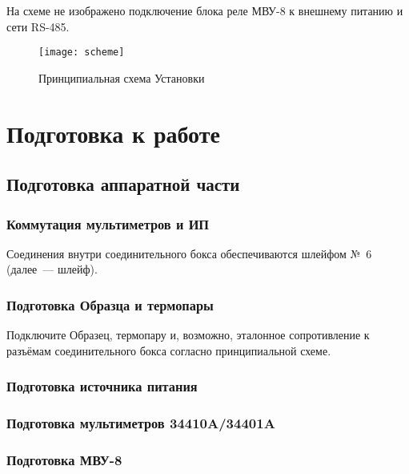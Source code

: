 \documentclass[12pt, a4paper, twocolumn]{report}
\begin{document}
На схеме не изображено подключение блока реле МВУ-8 к внешнему питанию и сети RS-485.

\begin{figure*}
\begin{center}
\texttt{[image: scheme]}
\end{center}
\caption{Принципиальная схема Установки}
\label{pic-scheme}
\end{figure*}

\chapter{Подготовка к работе}

\section{Подготовка аппаратной части}

\subsection{Коммутация мультиметров и ИП}

Соединения внутри соединительного бокса обеспечиваются шлейфом №~6 (далее~--- шлейф).



\subsection{Подготовка Образца и термопары}

Подключите Образец, термопару и, возможно, эталонное сопротивление к разъёмам соединительного бокса согласно принципиальной схеме.

\subsection{Подготовка источника питания}



\subsection{Подготовка мультиметров 34410A/34401A}



\subsection{Подготовка МВУ-8}
\end{document}
